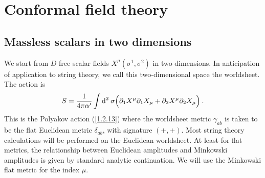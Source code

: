 
\chapter{\texorpdfstring{Conformal field theory}{2 Conformal field theory}} \label{cha:2}

\section{\texorpdfstring{Massless scalars in two dimensions}{2.1 Massless scalars in two dimensions}} \label{sec:2.1}
We start from $D$ free scalar fields $X^{\mu}(\sigma^{1}, \sigma^{2})$ in two dimensions. In anticipation of application to string theory, we call this two-dimensional space the worldsheet.    
The action is    
\begin{equation}
	S=\frac{1}{4 \pi \alpha^{\prime}} \int \mathrm{d}^{2} \: \sigma
	\Bigl(\partial_{1} X^{\mu} \partial_{1} X_{\mu}+\partial_{2} X^{\mu} \partial_{2} X_{\mu}\Bigr) \:. \label{2.1.1}
\end{equation}
This is the Polyakov action (\ref{1.2.13}) where the worldsheet metric $\gamma_{a b}$ is taken to be the flat Euclidean metric $\delta_{a b}$, with signature $(+,+)$.    
Most string theory calculations will be performed on the Euclidean worldsheet.    
At least for flat metrics, the relationship between Euclidean amplitudes and Minkowski amplitudes is given by standard analytic continuation.    
We will use the Minkowski flat metric for the index $\mu$.    

